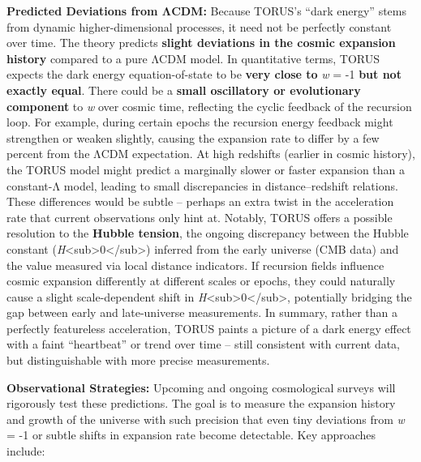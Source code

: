 \textbf{Predicted Deviations from ΛCDM:} Because TORUS's ``dark energy''
stems from dynamic higher-dimensional processes, it need not be
perfectly constant over time. The theory predicts \textbf{slight
deviations in the cosmic expansion history} compared to a pure ΛCDM
model. In quantitative terms, TORUS expects the dark energy
equation-of-state to be \textbf{very close to} \emph{w} = -1 \textbf{but
not exactly equal}​. There could be a \textbf{small oscillatory or
evolutionary component} to \emph{w} over cosmic time, reflecting the
cyclic feedback of the recursion loop​. For example, during certain
epochs the recursion energy feedback might strengthen or weaken
slightly, causing the expansion rate to differ by a few percent from the
ΛCDM expectation. At high redshifts (earlier in cosmic history), the
TORUS model might predict a marginally slower or faster expansion than a
constant-Λ model, leading to small discrepancies in distance--redshift
relations​. These differences would be subtle -- perhaps an extra twist
in the acceleration rate that current observations only hint at.
Notably, TORUS offers a possible resolution to the \textbf{Hubble
tension}​, the ongoing discrepancy between the Hubble constant
(\emph{H}\textless{}sub\textgreater{}0\textless{}/sub\textgreater{})
inferred from the early universe (CMB data) and the value measured via
local distance indicators. If recursion fields influence cosmic
expansion differently at different scales or epochs, they could
naturally cause a slight scale-dependent shift in
\emph{H}\textless{}sub\textgreater{}0\textless{}/sub\textgreater{}​,
potentially bridging the gap between early and late-universe
measurements. In summary, rather than a perfectly featureless
acceleration, TORUS paints a picture of a dark energy effect with a
faint ``heartbeat'' or trend over time -- still consistent with current
data, but distinguishable with more precise measurements.

\textbf{Observational Strategies:} Upcoming and ongoing cosmological
surveys will rigorously test these predictions. The goal is to measure
the expansion history and growth of the universe with such precision
that even tiny deviations from \emph{w} = -1 or subtle shifts in
expansion rate become detectable. Key approaches include:

